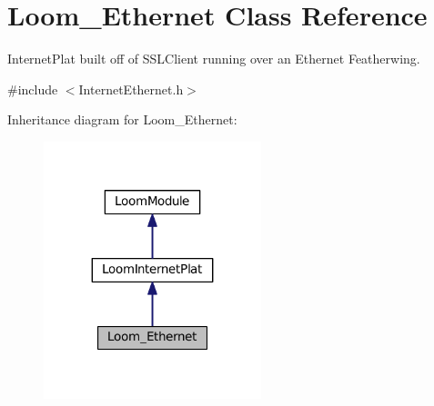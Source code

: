 \hypertarget{class_loom___ethernet}{}\section{Loom\+\_\+\+Ethernet Class Reference}
\label{class_loom___ethernet}


Internet\+Plat built off of S\+S\+L\+Client running over an Ethernet Featherwing.  




{\ttfamily \#include $<$Internet\+Ethernet.\+h$>$}



Inheritance diagram for Loom\+\_\+\+Ethernet\+:\nopagebreak
\begin{figure}[H]
\begin{center}
\leavevmode
\includegraphics[width=179pt]{class_loom___ethernet__inherit__graph}
\end{center}
\end{figure}
